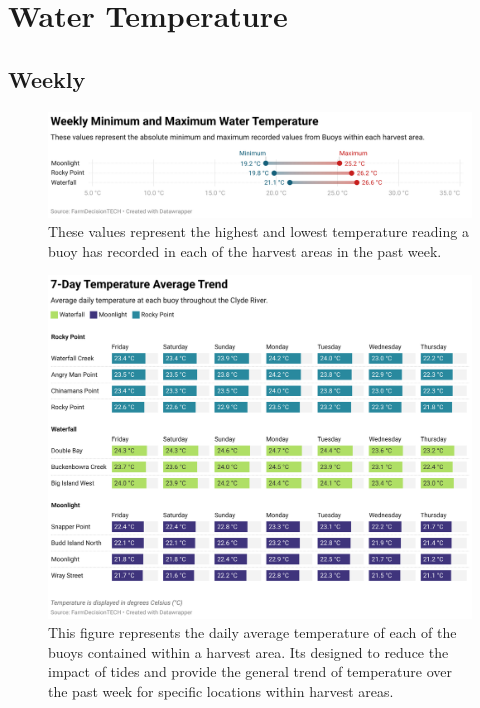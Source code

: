 \documentclass[10pt]{article}
\begin{document}
\pagebreak

\newpage
\section{Water Temperature}
\subsection{Weekly}

\begin{figure}[H]
\centering
\includegraphics[width=\textwidth]{weekly-temperature-extremes.png}
\caption[Weekly Minimum and Maximum Temperature]{These values represent the highest and lowest temperature reading a buoy has recorded in each of the harvest areas in the past week.}
\end{figure}

\begin{figure}[H]
\centering
\includegraphics[width=\textwidth]{weekly-temperature.png}
\caption[Average Weekly Temperature Table]{This figure represents the daily average temperature of each of the buoys contained within a harvest area. Its designed to reduce the impact of tides and provide the general trend of temperature over the past week for specific locations within harvest areas.}
\end{figure}
\end{document}
